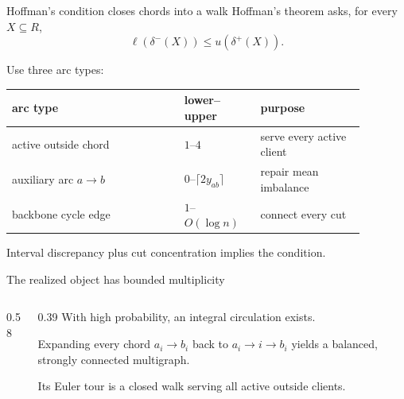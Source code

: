 \documentclass[aspectratio=169,12pt]{beamer}
\newcommand{\1}{\mathbf{1}}
\begin{document}
\begin{frame}{Hoffman's condition closes chords into a walk}
  Hoffman's theorem asks, for every \(X\subseteq R\),
  \[
    \ell(\delta^-(X))\le u(\delta^+(X)).
  \]

  \vspace{-0.02cm}
  Use three arc types:
  \begin{center}
  \begin{tabular}{>{\raggedright\arraybackslash}p{0.43\linewidth}
                  >{\centering\arraybackslash}p{0.19\linewidth}
                  >{\raggedright\arraybackslash}p{0.26\linewidth}}
    \toprule
    \textbf{arc type} & \textbf{lower}--\textbf{upper} & \textbf{purpose}\\
    \midrule
    active outside chord & \(1\)--\(4\) & serve every active client\\
    auxiliary arc \(a\to b\) & \(0\)--\(\lceil2y_{ab}\rceil\) & repair mean imbalance\\
    backbone cycle edge & \(1\)--\(O(\log n)\) & connect every cut\\
    \bottomrule
  \end{tabular}
  \end{center}

  \small Interval discrepancy plus cut concentration implies the condition.
\end{frame}

\begin{frame}{The realized object has bounded multiplicity}
  \begin{columns}[T,onlytextwidth]
    \begin{column}{0.58\textwidth}
      \centering
      \resizebox{0.91\linewidth}{!}{\StOfflineWalk}
    \end{column}
    \begin{column}{0.39\textwidth}
      With high probability, an integral circulation exists.

      \vspace{0.30cm}
      Expanding every chord
      \(a_i\to b_i\) back to
      \(a_i\to i\to b_i\) yields a balanced, strongly connected multigraph.

      \vspace{0.30cm}
      Its Euler tour is a closed walk serving all active outside clients.
    \end{column}
  \end{columns}
\end{frame}
\end{document}
